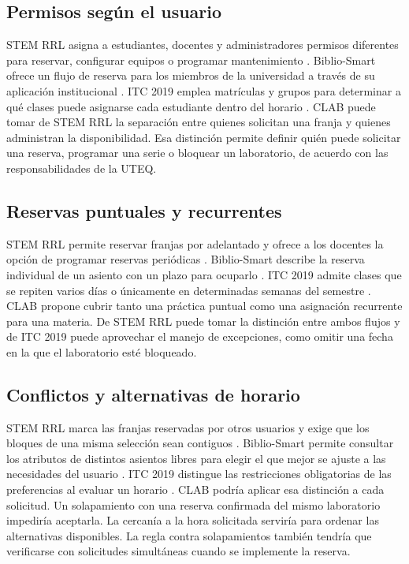 {  \subsection{Permisos según el usuario}

  STEM RRL asigna a estudiantes, docentes y administradores permisos diferentes
  para reservar, configurar equipos o programar mantenimiento
  \cite{gilVera2024}. Biblio-Smart ofrece un flujo de reserva para los miembros
  de la universidad a través de su aplicación institucional
  \cite{garciaGranja2022}. ITC 2019 emplea matrículas y grupos para determinar
  a qué clases puede asignarse cada estudiante dentro del horario
  \cite{muller2025}. CLAB puede tomar de STEM RRL la separación entre quienes
  solicitan una franja y quienes administran la disponibilidad. Esa distinción
  permite definir quién puede solicitar una reserva, programar una serie o
  bloquear un laboratorio, de acuerdo con las responsabilidades de la UTEQ.

  \subsection{Reservas puntuales y recurrentes}

  STEM RRL permite reservar franjas por adelantado y ofrece a los docentes
  la opción de programar reservas periódicas \cite{gilVera2024}.
  Biblio-Smart describe la reserva individual de un asiento con un plazo
  para ocuparlo \cite{garciaGranja2022}. ITC 2019 admite clases que se repiten
  varios días o únicamente en determinadas semanas del semestre
  \cite{muller2025}. CLAB propone cubrir tanto una práctica puntual como una
  asignación recurrente para una materia. De STEM RRL puede tomar la
  distinción entre ambos flujos y de ITC 2019 puede aprovechar el manejo de
  excepciones, como omitir una fecha en la que el laboratorio esté bloqueado.

  \subsection{Conflictos y alternativas de horario}

  STEM RRL marca las franjas reservadas por otros usuarios y exige que los
  bloques de una misma selección sean contiguos \cite{gilVera2024}.
  Biblio-Smart permite consultar los atributos de distintos asientos libres
  para elegir el que mejor se ajuste a las necesidades del usuario
  \cite{garciaGranja2022}. ITC 2019 distingue las restricciones obligatorias
  de las preferencias al evaluar un horario \cite{muller2025}. CLAB podría
  aplicar esa distinción a cada solicitud. Un solapamiento con una reserva
  confirmada del mismo laboratorio impediría aceptarla. La cercanía a la hora
  solicitada serviría para ordenar las alternativas disponibles. La regla
  contra solapamientos también tendría que verificarse con solicitudes
  simultáneas cuando se implemente la reserva.

}

